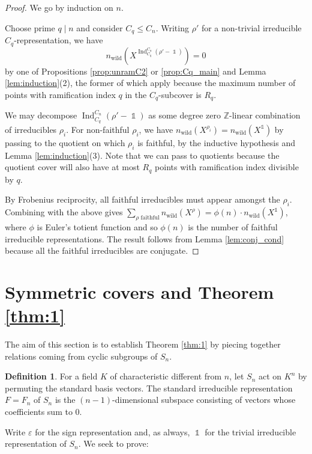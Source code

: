 \documentclass[12pt]{amsart}
\theoremstyle{definition}
\newtheorem{definition}[theorem]{Definition}
\theoremstyle{remark}
\newcommand{\eps}{\varepsilon}
\newcommand{\ZZ}{\mathbb{Z}}
\DeclareMathOperator{\Ind}{Ind}
\DeclareMathOperator{\wild}{wild}
\DeclareMathOperator{\one}{\mathds{1}}
\begin{document}
\begin{proof}
    We go by induction on $n$.
    
    Choose prime $q\mid n$ and consider $C_q\le C_n$. Writing $\rho'$ for a non-trivial irreducible $C_q$-representation, we have
    \[n_{\wild}(X^{\Ind_{C_q}^{C_n}(\rho'-\one)})=0\]
    by one of Propositions \ref{prop:unramC2} or \ref{prop:Cq_main} and Lemma \ref{lem:induction}(2), the former of which apply because the maximum number of points with ramification index $q$ in the $C_q$-subcover is $R_q$.

    We may decompose $\Ind_{C_q}^{C_n}(\rho'-\one)$ as some degree zero $\ZZ$-linear combination of irreducibles $\rho_i$. For non-faithful $\rho_i$, we have $n_{\wild}(X^{\rho_i})=n_{\wild}(X^{\one})$ by passing to the quotient on which $\rho_i$ is faithful, by the inductive hypothesis and Lemma \ref{lem:induction}(3). Note that we can pass to quotients because the quotient cover will also have at most $R_q$ points with ramification index divisible by $q$.

    By Frobenius reciprocity, all faithful irreducibles must appear amongst the $\rho_i$. Combining with the above gives $\sum_{\rho\text{ faithful}}n_{\wild}(X^{\rho}) =\phi(n)\cdot n_{\wild}(X^{\one})$, where $\phi$ is Euler's totient function and so $\phi(n)$ is the number of faithful irreducible representations. The result follows from Lemma \ref{lem:conj_cond} because all the faithful irreducibles are conjugate.
\end{proof}

\section{Symmetric covers and Theorem \ref{thm:1}}\label{sec:Sn}
The aim of this section is to establish Theorem \ref{thm:1} by piecing together relations coming from cyclic subgroups of $S_n$.

\begin{definition}\label{def:standard}
    For a field $K$ of characteristic different from $n$, let $S_n$ act on $K^n$ by permuting the standard basis vectors. The standard irreducible representation $F=F_n$ of $S_n$ is the $(n-1)$-dimensional subspace consisting of vectors whose coefficients sum to $0$.
\end{definition}

Write $\eps$ for the sign representation and, as always, $\one$ for the trivial irreducible representation of $S_n$. We seek to prove:
\end{document}
